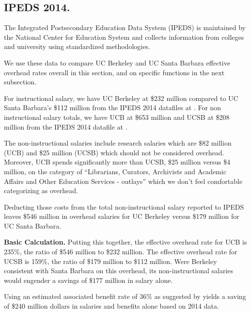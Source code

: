 \documentclass[11pt]{article}
\begin{document}
\subsection{IPEDS 2014.}

The Integrated Postsecondary Education Data System (IPEDS) is
maintained by the National Center for Education System and collects
information from colleges and university using standardized
methodologies.

We use these data to compare UC Berkeley and UC Santa Barbara effective overhead
rates overall in this section, and on specific functions in the next
subsection.

For instructional salary, we have UC Berkeley at \$232 million
compared to UC Santa Barbara's \$112 million from the IPEDS 2014
datafiles at \cite{ipeds-is}.  For non instructional salary totals, we
have UCB at \$653 million and UCSB at \$208 million from the IPEDS
2014 datafile at \cite{ipeds-nis}.

The non-instructional salaries include research salaries which are
\$82 million (UCB) and \$25 million (UCSB) which should not be
considered overhead. Moreover, UCB spends significantly more than UCSB, \$25
million versus \$4 million, on the category of ``Librarians, Curators,
Archivists and Academic Affairs and Other Education Services -
outlays'' which we don't feel comfortable categorizing as overhead.

Deducting those costs from the total non-instructional salary reported
to IPEDS leaves \$546 million in overhead salaries for UC Berkeley
versus \$179 million for UC Santa Barbara.

{\bf Basic Calculation.} Putting this together, the effective overhead
rate for UCB is 235\%, the ratio of \$546 million to \$232
million. The effective overhead rate for UCSB is 159\%, the ratio of
\$179 million to \$112 million.  Were Berkeley consistent with Santa
Barbara on this overhead, its non-instructional salaries would
engender a savings of \$177 million in salary alone.

Using an estimated associated benefit rate of 36\% as suggested by
\cite{rev-trends} yields a saving of \$240 million dollars in salaries
and benefits alone based on 2014 data.  

\iffalse
Of course, one could argue that research induces overhead as well.
Thus, we include a calculation where the rate is
limited to 57\%: the federally negotiated overhead on research grants.
\fi
\end{document}
